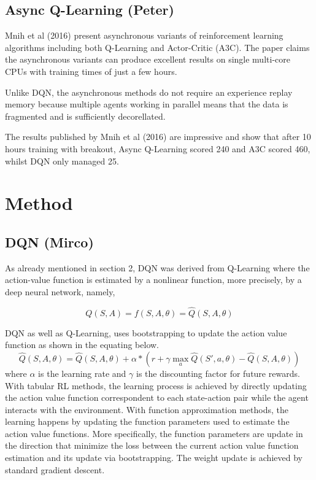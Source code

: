 \documentclass{article}
\begin{document}
\subsection{Async Q-Learning (Peter)}

Mnih et al (2016) present asynchronous variants of reinforcement learning algorithms including both Q-Learning and Actor-Critic (A3C).
The paper claims the asynchronous variants can produce excellent results on single multi-core CPUs with training times of just a few hours.

Unlike DQN, the asynchronous methods do not require an experience replay memory because multiple agents working in parallel means that the data is fragmented and is sufficiently decorellated.

The results published by Mnih et al (2016) are impressive and show that after 10 hours training with breakout, Async Q-Learning scored 240 and A3C scored 460, whilst DQN only managed 25.


\section{Method}
\subsection{DQN (Mirco)}

As already mentioned in section 2, DQN was derived from Q-Learning where the action-value function is estimated by a nonlinear function, more precisely, by a deep neural network, namely,

\begin{equation}
Q(S,A) = f(S,A,\theta) = \hat{Q}(S,A,\theta)
\end{equation}

DQN as well as Q-Learning, uses bootstrapping to update the action value function as shown in the equating below. 
\begin{equation}
\hat{Q}(S,A,\theta) = \hat{Q}(S,A,\theta) + \alpha * \left( r + \gamma \max_{a} \hat{Q}(S',a,\theta) - \hat{Q}(S,A,\theta) \right)
\end{equation}
where $\alpha$ is the learning rate and $\gamma$ is the discounting factor for future rewards.
With tabular RL methods, the learning process is achieved by directly updating the action value function correspondent to each state-action pair while the agent interacts with the environment. With function approximation methods, the learning happens by updating the function parameters used to estimate the action value functions.
More specifically, the function parameters are update in the direction that minimize the loss between the current action value function estimation and its update via bootstrapping. The weight update is achieved by standard gradient descent.
\end{document}

